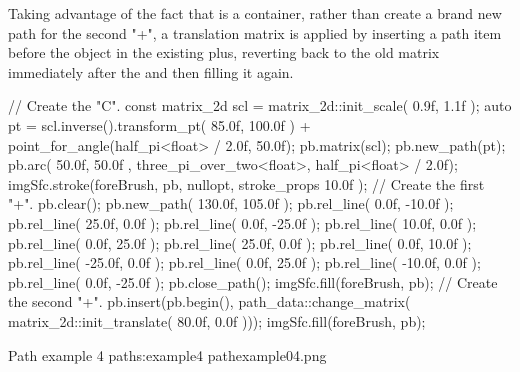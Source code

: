 \pnum
Taking advantage of the fact that  is a container, rather than create a brand new path for the second "+", a translation matrix is applied by inserting a  path item before the  object in the existing plus, reverting back to the old matrix immediately after the  and then filling it again.

\begin{codeblock}
// Create the "C".
const matrix_2d scl = matrix_2d::init_scale({ 0.9f, 1.1f });
auto pt = scl.inverse().transform_pt({ 85.0f, 100.0f }) +
  point_for_angle(half_pi<float> / 2.0f, 50.0f);
pb.matrix(scl);
pb.new_path(pt);
pb.arc({ 50.0f, 50.0f }, three_pi_over_two<float>, half_pi<float> / 2.0f);
imgSfc.stroke(foreBrush, pb, nullopt, stroke_props{ 10.0f });
// Create the first "+".
pb.clear();
pb.new_path({ 130.0f, 105.0f });
pb.rel_line({ 0.0f, -10.0f });
pb.rel_line({ 25.0f, 0.0f });
pb.rel_line({ 0.0f, -25.0f });
pb.rel_line({ 10.0f, 0.0f });
pb.rel_line({ 0.0f, 25.0f });
pb.rel_line({ 25.0f, 0.0f });
pb.rel_line({ 0.0f, 10.0f });
pb.rel_line({ -25.0f, 0.0f });
pb.rel_line({ 0.0f, 25.0f });
pb.rel_line({ -10.0f, 0.0f });
pb.rel_line({ 0.0f, -25.0f });
pb.close_path();
imgSfc.fill(foreBrush, pb);
// Create the second "+".
pb.insert(pb.begin(), path_data::change_matrix(
  matrix_2d::init_translate({ 80.0f, 0.0f })));
imgSfc.fill(foreBrush, pb);
\end{codeblock}

\begin{importgraphiciotwod}
{Path example 4}
{paths:example4}
{pathexample04.png}
\end{importgraphiciotwod}

\FloatBarrier
%
%
%
%
%
%
